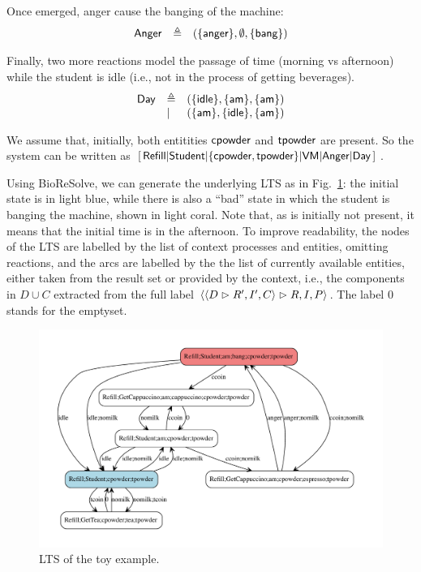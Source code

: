 Once emerged, anger cause the banging of the machine:
\[
\begin{array}{lll}
\mathsf{Anger} & \triangleq & (\{{\text{\sffamily anger}}\},\emptyset,\{{\text{\sffamily bang}}\})
\end{array}
\]

Finally, two more reactions model the passage of time (morning vs afternoon) while the student is idle (i.e., not in the process of getting beverages).
\[
\begin{array}{lll}
\mathsf{Day} & \triangleq & (\{{\text{\sffamily idle}}\},\{{\text{\sffamily am}}\},\{{\text{\sffamily am}}\})\\
& | & (\{{\text{\sffamily am}}\},\{{\text{\sffamily idle}}\},\{{\text{\sffamily am}}\})
\end{array}
\]

We assume that, initially, both entitities ${\text{\sffamily cpowder}}$ and ${\text{\sffamily tpowder}}$ are present.
So the system can be written as 
\(
[\,\mathsf{Refill}
| \mathsf{Student}
| \{{\text{\sffamily cpowder}},{\text{\sffamily tpowder}}\} 
| \mathsf{VM}
| \mathsf{Anger}
| \mathsf{Day}\,]
\).


Using BioReSolve, we can generate the underlying LTS as in Fig.~\ref{fig:toylts}: the initial state is in light blue, while there is also a ``bad'' state in which the student is banging the machine, shown in light coral.
Note that, as \am is initially not present, it means that the initial time is in the afternoon.
To improve readability, the nodes of the LTS are labelled by the list of context processes and entities, omitting reactions, and the arcs are labelled by the the list of currently available entities, either taken from the result set or provided by the context, i.e., the components in $D\cup C$ extracted from the full label $\langle \langle D\vartriangleright R',I',C\rangle\vartriangleright R,I,P\rangle$. The label $0$ stands for the emptyset.

\begin{figure}
\includegraphics[scale=.3]{./figs/toylts}
\caption{LTS of the toy example.\label{fig:toylts}}
\end{figure}

